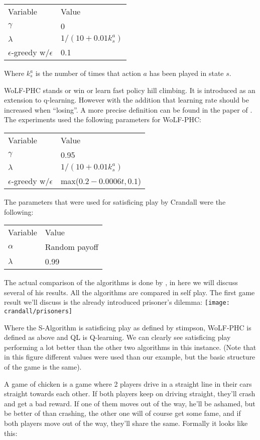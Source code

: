 \begin{tabular}{ll}
  Variable & Value \\
  $\gamma$ & 0 \\
  $\lambda$ & $1/(10+0.01 k_s^a)$ \\
  $\epsilon$-greedy w/$\epsilon$ & 0.1
\end{tabular}

\cleared Where $k^a_s$ is the number of times that action $a$ has been played
in state $s$.

\cleared WoLF-PHC stands or win or learn fast policy hill climbing. It is 
introduced as an extension to q-learning. However with the addition that
learning rate should be increased when ``losing''. A more precise definition
can be found in the paper of \citep{bowling}. The experiments used the following
parameters for WoLF-PHC:
\begin{tabular}{ll}
  Variable & Value \\
  $\gamma$ & 0.95 \\
  $\lambda$ & $1/(10+0.01 k_s^a)$ \\
  $\epsilon$-greedy w/$\epsilon$ & max($0.2-0.0006 t, 0.1$)
\end{tabular}

\cleared The parameters that were used for satisficing play by Crandall were the
following:

\begin{tabular}{ll}
  Variable & Value \\
  $\alpha$ & Random payoff \\
  $\lambda$ & 0.99 \\
\end{tabular}

\cleared The actual comparison of the algorithms is done by \citep{crandall},
in here we will discuss several of his results.
All the algorithms are compared in self play. 
The first game result we'll discuss
is the already introduced prisoner's dilemma:
\texttt{[image: crandall/prisoners]}

\cleared Where the S-Algorithm is satisficing play as defined by stimpson,
WoLF-PHC is defined as above and QL is Q-learning.
We can clearly see satisficing play
performing a lot better than the other two algorithms in this instance.
(Note that in this figure different values were used than our example, but
the basic structure of the game is the same).

\cleared A game of chicken is a game where 2 players drive in a straight line in their
cars straight towards each other. If both players keep on driving straight,
they'll crash and get a bad reward. If one of them moves out of the way, he'll
be ashamed, but be better of than crashing, the other one will of course get
some fame, and if both players move out of the way, they'll share the same.
Formally it looks like this:

